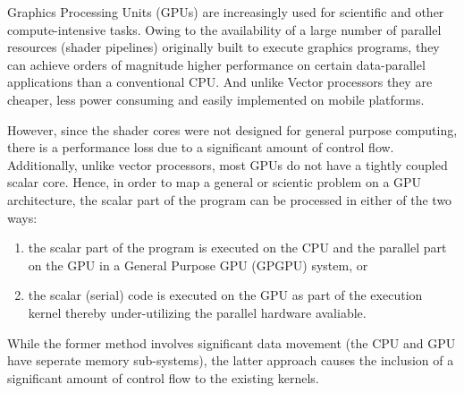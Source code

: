 
\par{Graphics Processing Units (GPUs) are increasingly used for scientific and other compute-intensive tasks. Owing to the availability of a large number of parallel resources (shader pipelines) originally built to execute graphics programs, they can achieve orders of magnitude higher performance on certain data-parallel applications than a conventional CPU. And unlike Vector processors they are cheaper, less power consuming and easily implemented on mobile platforms.
}

\par{
However, since the shader cores were not designed for general purpose computing, there is a performance loss due to a significant amount of control flow. Additionally, unlike vector processors, most GPUs do not have a tightly coupled scalar core. Hence, in order to map a general or scientic problem on a GPU architecture, the scalar part of the program can be processed in either of the two ways:}

\begin{enumerate}
	\item the scalar part of the program is executed on the CPU and the parallel part on the GPU in a General Purpose GPU (GPGPU) system, or 
	\item the scalar (serial) code is executed on the GPU as part of the execution kernel thereby under-utilizing the parallel hardware avaliable.
\end{enumerate} 

\par{
While the former method involves significant data movement (the CPU and GPU have seperate memory sub-systems), the latter approach causes the inclusion of a significant amount of control flow to the existing kernels.}
